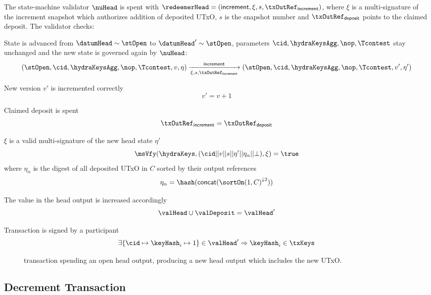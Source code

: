 \noindent The state-machine validator $\nuHead$ is spent with
$\redeemerHead = (\mathsf{increment}, \xi, s, \txOutRef_{\mathsf{increment}})$,
where $\xi$ is a multi-signature of the increment snapshot which authorizes
addition of deposited UTxO, $s$ is the snapshot number and
$\txOutRef_{\mathsf{deposit}}$ points to the claimed deposit. The validator
checks:
\begin{menumerate}
  \item State is advanced from $\datumHead \sim \stOpen$ to
  $\datumHead' \sim \stOpen$, parameters $\cid,\hydraKeysAgg,\nop,\Tcontest$
  stay unchanged and the new state is governed again by $\nuHead$:
  \[
	(\stOpen,\cid,\hydraKeysAgg,\nop,\Tcontest,v,\eta) \xrightarrow[\xi, s, \txOutRef_{\mathsf{increment}}]{\mathsf{increment}} (\stOpen,\cid,\hydraKeysAgg,\nop,\Tcontest,v',\eta')
  \]
  \item New version $v'$ is incremented correctly
  \[
	v' = v + 1
  \]
  \item Claimed deposit is spent
  \[
    \txOutRef_{\mathsf{increment}} = \txOutRef_{\mathsf{deposit}}
  \]
  \item $\xi$ is a valid multi-signature of the new head state $\eta'$
  \[
	\msVfy(\hydraKeys,(\cid || v || s || \eta' || \eta_\alpha || \bot),\xi) = \true
  \]
  where $\eta_\alpha$ is the digest of all deposited UTxO in $C$ sorted by their output
  references
  \[
	\eta_\alpha = \hash(\mathsf{concat}({\sortOn(1, C)}^{\downarrow2}))
  \]
  \item The value in the head output is increased accordingly
  \[
	\valHead \cup \valDeposit = \valHead'
  \]
  \item Transaction is signed by a participant
  \[
	\exists \{\cid \mapsto \keyHash_{i} \mapsto 1\} \in \valHead' \Rightarrow \keyHash_{i} \in \txKeys
  \]
\end{menumerate}


\begin{figure}
  \centering
  
  \caption{\mtxIncrement{} transaction spending an open head output,
	producing a new head output which includes the new UTxO.}\label{fig:incrementTx}
\end{figure}

\subsection{Decrement Transaction}\label{sec:decrement-tx}

